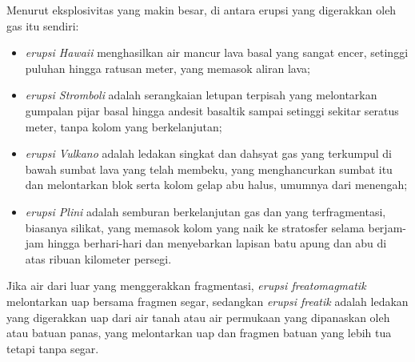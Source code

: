 \begin{definition}\label{def:b2:eruptive-styles:styles}
Menurut eksplosivitas yang makin besar, di antara erupsi yang digerakkan oleh gas  itu sendiri:
\begin{itemize}
\item \emph{erupsi Hawaii} menghasilkan air mancur
lava basal yang sangat encer, setinggi puluhan hingga ratusan meter, yang memasok aliran lava;
\item \emph{erupsi Stromboli} adalah serangkaian
letupan terpisah yang melontarkan gumpalan pijar  basal hingga
andesit basaltik sampai setinggi sekitar seratus meter, tanpa kolom
yang berkelanjutan;
\item \emph{erupsi Vulkano} adalah ledakan singkat dan dahsyat
gas yang terkumpul di bawah sumbat lava yang telah membeku, yang menghancurkan
sumbat itu dan melontarkan blok serta kolom gelap abu halus, umumnya dari
 menengah;
\item \emph{erupsi Plini} adalah semburan berkelanjutan gas
dan  yang terfragmentasi, biasanya silikat, yang memasok kolom yang naik ke
stratosfer selama berjam-jam hingga berhari-hari dan menyebarkan lapisan batu apung dan abu di atas
ribuan kilometer persegi.
\end{itemize}
Jika air dari luar yang menggerakkan fragmentasi, \emph{erupsi
freatomagmatik} melontarkan uap bersama fragmen
 segar, sedangkan \emph{erupsi freatik} adalah
ledakan yang digerakkan uap dari air tanah atau air permukaan yang dipanaskan oleh  atau batuan panas,
yang melontarkan uap dan fragmen batuan yang lebih tua tetapi tanpa  segar.
\end{definition}

